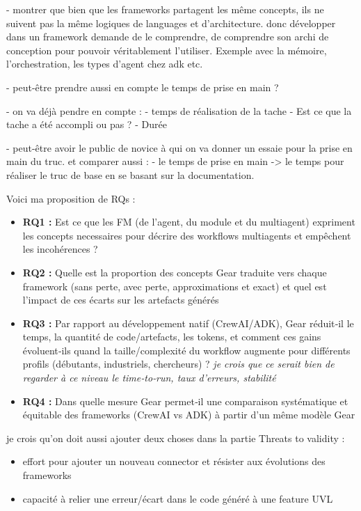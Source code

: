 - montrer que bien que les frameworks partagent les même concepts, ils ne suivent  pas la même logiques de languages et d'architecture. donc développer dans un framework demande de le comprendre, de comprendre son archi de conception pour pouvoir véritablement l'utiliser. Exemple avec la mémoire, l'orchestration, les types d'agent chez adk etc.

- peut-être prendre aussi en compte le temps de prise en main ? 

- on va déjà pendre en compte : 
    - temps de réalisation de la tache
    - Est ce que la tache a été accompli ou pas ? 
    - Durée

- peut-être avoir le public de novice à qui on va donner un essaie pour la prise en main du truc. et comparer aussi : 
    - le temps de prise en main -> le temps pour réaliser le truc de base en se basant sur la documentation.



Voici ma proposition de RQs : 
 \begin{itemize}
     \item \textbf{RQ1 :} Est ce que les FM (de l'agent, du module et du multiagent) expriment les concepts necessaires pour décrire des workflows multiagents  et empêchent les incohérences ?
     \item \textbf{RQ2 :} Quelle est la proportion des concepts Gear traduite vers chaque framework (sans perte, avec perte, approximations et exact) et quel est l'impact de ces écarts sur les artefacts générés
     \item \textbf{RQ3 :} Par rapport au développement natif (CrewAI/ADK), Gear réduit‑il le temps, la quantité de code/artefacts, les tokens, et comment ces gains évoluent‑ils quand la taille/complexité du workflow augmente pour différents profils (débutants, industriels, chercheurs) ? \textit{je crois que ce serait bien de regarder à ce niveau le time‑to‑run, taux d’erreurs, stabilité}
     \item \textbf{RQ4 :} Dans quelle mesure Gear permet‑il une comparaison systématique et équitable des frameworks (CrewAI vs ADK) à partir d’un même modèle Gear
 \end{itemize}

 je crois qu'on doit aussi ajouter deux choses dans la partie Threats to validity :
 \begin{itemize}
     \item effort pour ajouter un nouveau connector et résister aux évolutions des frameworks
     \item capacité à relier une erreur/écart dans le code généré à une feature UVL
 \end{itemize}

 